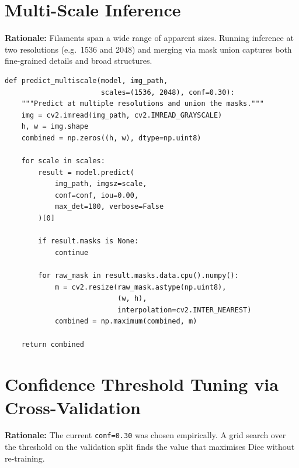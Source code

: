 \documentclass[11pt,a4paper,openany]{report}
\begin{document}
\section{Multi-Scale Inference}

\textbf{Rationale:} Filaments span a wide range of apparent sizes. Running inference at two
resolutions (e.g.\ 1536 and 2048) and merging via mask union captures both fine-grained
details and broad structures.

\begin{lstlisting}[caption={Multi-scale inference and mask union},label={lst:multiscale}]
def predict_multiscale(model, img_path,
                       scales=(1536, 2048), conf=0.30):
    """Predict at multiple resolutions and union the masks."""
    img = cv2.imread(img_path, cv2.IMREAD_GRAYSCALE)
    h, w = img.shape
    combined = np.zeros((h, w), dtype=np.uint8)

    for scale in scales:
        result = model.predict(
            img_path, imgsz=scale,
            conf=conf, iou=0.00,
            max_det=100, verbose=False
        )[0]

        if result.masks is None:
            continue

        for raw_mask in result.masks.data.cpu().numpy():
            m = cv2.resize(raw_mask.astype(np.uint8),
                           (w, h),
                           interpolation=cv2.INTER_NEAREST)
            combined = np.maximum(combined, m)

    return combined
\end{lstlisting}

\section{Confidence Threshold Tuning via Cross-Validation}

\textbf{Rationale:} The current \texttt{conf=0.30} was chosen empirically. A grid search over
the threshold on the validation split finds the value that maximises Dice without re-training.
\end{document}
